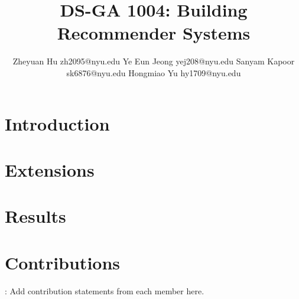 \documentclass{article}
\begin{document}
\title{DS-GA 1004: Building Recommender Systems}

\author{\name Zheyuan Hu \email zh2095@nyu.edu \AND
\name Ye Eun Jeong \email yej208@nyu.edu \AND
\name Sanyam Kapoor \email sk6876@nyu.edu \AND
\name Hongmiao Yu \email hy1709@nyu.edu
}


\maketitle

%

\vspace{-2em}

\section{Introduction}

 \citet{yifan2008,koren2009}

\section{Extensions}

 \citet{spark2010,sparksql2015}

\section{Results}


\section*{Contributions}

: Add contribution statements from each member here.


\end{document}

